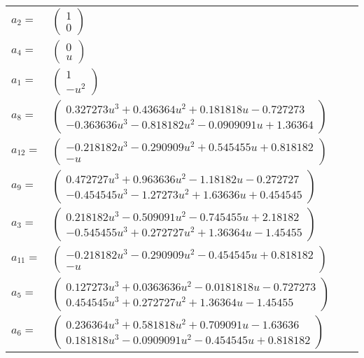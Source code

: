 \documentclass[1p]{elsarticle_modified}
\theoremstyle{definition}
\begin{document}
\begin{tabular}{m{7pt} m{180pt} m{7pt} m{180pt} }
\flushright $a_{2}=$&$\begin{pmatrix}1\\0\end{pmatrix}$ \\
\flushright $a_{4}=$&$\begin{pmatrix}0\\u\end{pmatrix}$ \\
\flushright $a_{1}=$&$\begin{pmatrix}1\\- u^2\end{pmatrix}$ \\
\flushright $a_{8}=$&$\begin{pmatrix}0.327273 u^{3}+0.436364 u^{2}+0.181818 u-0.727273\\-0.363636 u^{3}-0.818182 u^{2}-0.0909091 u+1.36364\end{pmatrix}$ \\
\flushright $a_{12}=$&$\begin{pmatrix}-0.218182 u^{3}-0.290909 u^{2}+0.545455 u+0.818182\\- u\end{pmatrix}$ \\
\flushright $a_{9}=$&$\begin{pmatrix}0.472727 u^{3}+0.963636 u^{2}-1.18182 u-0.272727\\-0.454545 u^{3}-1.27273 u^{2}+1.63636 u+0.454545\end{pmatrix}$ \\
\flushright $a_{3}=$&$\begin{pmatrix}0.218182 u^{3}-0.509091 u^{2}-0.745455 u+2.18182\\-0.545455 u^{3}+0.272727 u^{2}+1.36364 u-1.45455\end{pmatrix}$ \\
\flushright $a_{11}=$&$\begin{pmatrix}-0.218182 u^{3}-0.290909 u^{2}-0.454545 u+0.818182\\- u\end{pmatrix}$ \\
\flushright $a_{5}=$&$\begin{pmatrix}0.127273 u^{3}+0.0363636 u^{2}-0.0181818 u-0.727273\\0.454545 u^{3}+0.272727 u^{2}+1.36364 u-1.45455\end{pmatrix}$ \\
\flushright $a_{6}=$&$\begin{pmatrix}0.236364 u^{3}+0.581818 u^{2}+0.709091 u-1.63636\\0.181818 u^{3}-0.0909091 u^{2}-0.454545 u+0.818182\end{pmatrix}$ \\

\end{tabular}
\end{document}
